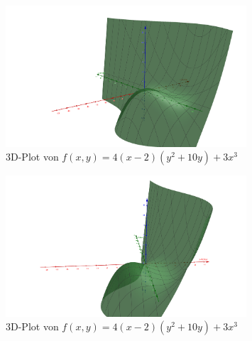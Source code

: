 \begin{figure}[ht]
  \centering
  \includegraphics[width=0.8\textwidth]{../pool/ex-fn-extrema-6-img-a.png}
  \caption{3D-Plot von $f(x,y) = 4(x-2)(y^2+10y)+3x^3$}
  \label{ex-fn-extrema-6-img-a}
\end{figure}

\begin{figure}[ht]
  \centering
  \includegraphics[width=0.8\textwidth]{../pool/ex-fn-extrema-6-img-b.png}
  \caption{3D-Plot von $f(x,y) = 4(x-2)(y^2+10y)+3x^3$}
  \label{ex-fn-extrema-6-img-b}
\end{figure}

